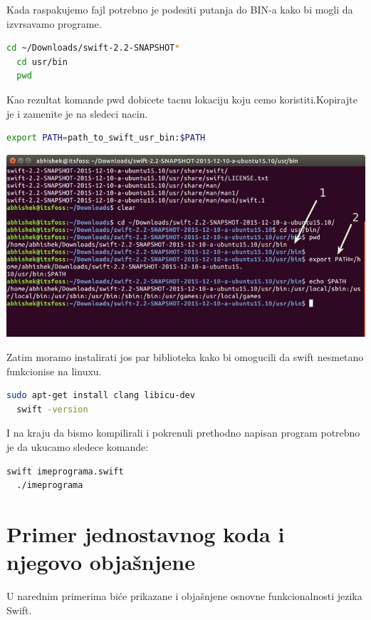 \documentclass[a4paper]{article}
\begin{document}
Kada raspakujemo fajl potrebno je podesiti putanja do BIN-a kako bi mogli da izvrsavamo programe.

\vspace{5mm}

\begin{lstlisting}[language=bash]
  cd ~/Downloads/swift-2.2-SNAPSHOT*
  cd usr/bin
  pwd
\end{lstlisting}

Kao rezultat komande pwd dobicete tacnu lokaciju koju cemo koristiti.Kopirajte je i zamenite je na sledeci nacin.
\begin{lstlisting}[language=bash]
  export PATH=path_to_swift_usr_bin:$PATH

\end{lstlisting}
\includegraphics[scale=0.4]{swift-lin.jpeg}


Zatim moramo instalirati jos par biblioteka kako bi omogucili da swift nesmetano funkcionise na linuxu.


\begin{lstlisting}[language=bash]
  sudo apt-get install clang libicu-dev
  swift -version
\end{lstlisting}

I na kraju da bismo kompilirali i pokrenuli prethodno napisan program potrebno je da ukucamo sledece komande:

\begin{lstlisting}[language=bash]
  swift imeprograma.swift
  ./imeprograma
\end{lstlisting}



\section{Primer jednostavnog koda i njegovo objašnjene}	
\label{sec:sestiDeo}

U narednim primerima biće prikazane i objašnjene osnovne funkcionalnosti jezika Swift.
\end{document}

